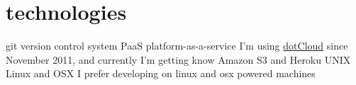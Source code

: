 \documentclass[]{k-cv}
\begin{document}
\section{technologies}

\begin{entrylist}
  \entry
    {git}
    {version control system}
    {}
    {}
  \entry
    {PaaS}
    {platform-as-a-service}
    {}
    {I'm using \href{http://dotcloud.com}{dotCloud} since November 2011, and currently I'm getting know Amazon S3 and Heroku}
  \entry
	{UNIX}
	{Linux and OSX}
	{}
	{I prefer developing on linux and osx powered machines}
\end{entrylist}


\end{document}
